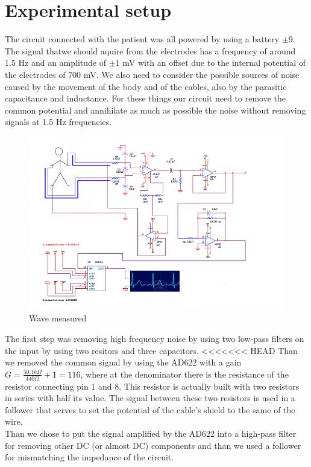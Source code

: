\section{Experimental setup}
The circuit connected with the patient was all powered by using a battery $\pm 9$.
The signal thatwe should aquire from the electrodes has a frequency of around 1.5 Hz and an amplitude of $\pm$1 mV with an offset due to the internal potential of the electrodes of 700 mV. We also need to consider the possible sources of noise caused by the movement of the body and of the cables, also by the parasitic capacitance and inductance. For these things our circuit need to remove the common potential and annihilate as much as possible the noise without removing signals at 1.5 Hz frequencies.
\begin{figure}
\centering
\includegraphics[width=.8\textwidth]{8/circuit.png}
\caption{Wave measured}
\end{figure}
The  first step was removing high frequency noise by using two low-pass filters on the input by using two resitors and three capacitors.
<<<<<<< HEAD
Than we removed the common signal by using the AD622 with a gain $G =   \frac{50.1 k\Omega}{440 \Omega} + 1 = 116$, where at the denominator there is the resistance of the resistor connecting pin 1 and 8. This resistor is actually built with two resistors in series with half its value. The signal between these two resistors is used in a follower that serves to set the potential of the cable's shield to the same of the wire.\\

Than we chose to put the signal amplified by the AD622 into a high-pass filter for removing other DC (or almost DC) components and than we used a follower for mismatching the impedance of the circuit.\\

